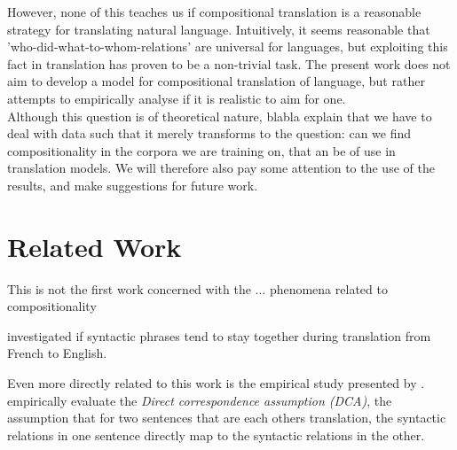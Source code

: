 \documentclass{report}
\theoremstyle{indented}
\begin{document}

However, none of this teaches us if compositional translation is a reasonable strategy for translating natural language. Intuitively, it seems reasonable that 'who-did-what-to-whom-relations' are universal for languages, but exploiting this fact in translation has proven to be a non-trivial task. The present work does not aim to develop a model for compositional translation of language, but rather attempts to empirically analyse if it is realistic to aim for one.\\
Although this question is of theoretical nature, blabla explain that we have to deal with data such that it merely transforms to the question: can we find compositionality in the corpora we are training on, that an be of use in translation models. We will therefore also pay some attention to the use of the results, and make suggestions for future work.

\section*{Related Work}

This is not the first work concerned with the ... phenomena related to compositionality

\cite{fox2002phrasal} investigated if syntactic phrases tend to stay together during translation from French to English.

Even more directly related to this work is the empirical study presented by \cite{hwa2002evaluating}. \citeauthor{hwa2002evaluating} empirically evaluate the \textit{Direct correspondence assumption (DCA)}, the assumption that for two sentences that are each others translation, the syntactic relations in one sentence directly map to the syntactic relations in the other. %
\end{document}
